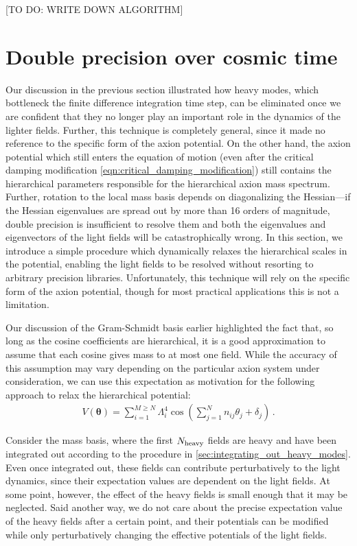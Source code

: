 \documentclass[11pt]{article}
\begin{document}
[TO DO: WRITE DOWN ALGORITHM]

\section{Double precision over cosmic time}\label{sec:double_precision_over_cosmic_time}
Our discussion in the previous section illustrated how heavy modes, which bottleneck the finite difference integration time step, can be eliminated once we are confident that they no longer play an important role in the dynamics of the lighter fields. Further, this technique is completely general, since it made no reference to the specific form of the axion potential. On the other hand, the axion potential which still enters the equation of motion (even after the critical damping modification \cref{eqn:critical_damping_modification}) still contains the hierarchical parameters responsible for the hierarchical axion mass spectrum. Further, rotation to the local mass basis depends on diagonalizing the Hessian---if the Hessian eigenvalues are spread out by more than 16 orders of magnitude, double precision is insufficient to resolve them and both the eigenvalues and eigenvectors of the light fields will be catastrophically wrong. In this section, we introduce a simple procedure which dynamically relaxes the hierarchical scales in the potential, enabling the light fields to be resolved without resorting to arbitrary precision libraries. Unfortunately, this technique will rely on the specific form of the axion potential, though for most practical applications this is not a limitation.

Our discussion of the Gram-Schmidt basis earlier highlighted the fact that, so long as the cosine coefficients are hierarchical, it is a good approximation to assume that each cosine gives mass to at most one field. While the accuracy of this assumption may vary depending on the particular axion system under consideration, we can use this expectation as motivation for the following approach to relax the hierarchical potential:
\begin{align}
    V({\bm\theta}) = \sum_{i = 1}^{M\geq N}\Lambda_i^4\cos\left(\sum_{j = 1}^N n_{ij}\theta_j + \delta_j\right)\,.
\end{align}

Consider the mass basis, where the first $N_{\rm heavy}$ fields are heavy and have been integrated out according to the procedure in \cref{sec:integrating_out_heavy_modes}. Even once integrated out, these fields can contribute perturbatively to the light dynamics, since their expectation values are dependent on the light fields. At some point, however, the effect of the heavy fields is small enough that it may be neglected. Said another way, we do not care about the precise expectation value of the heavy fields after a certain point, and their potentials can be modified while only perturbatively changing the effective potentials of the light fields.
\end{document}
